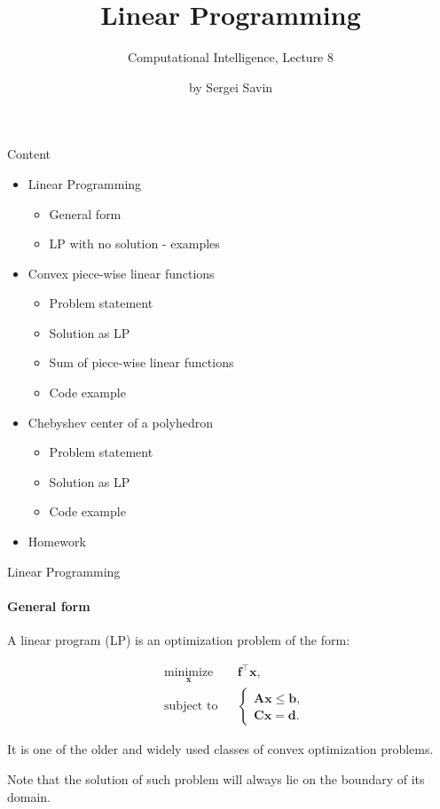 \documentclass{beamer}
\title{Linear Programming}
\subtitle{Computational Intelligence, Lecture 8}
\author{by Sergei Savin}
\date{\mydate}
\begin{document}
\maketitle


\begin{frame}{Content}

\begin{itemize}
\item Linear Programming
\begin{itemize}
    \item General form
    \item LP with no solution - examples
\end{itemize}
\item Convex piece-wise linear functions
\begin{itemize}
    \item Problem statement
    \item Solution as LP
    \item Sum of piece-wise linear functions
    \item Code example
\end{itemize}
\item Chebyshev center of a polyhedron
\begin{itemize}
    \item Problem statement
    \item Solution as LP
    \item Code example
\end{itemize}
\item Homework
\end{itemize}

\end{frame}



\begin{frame}{Linear Programming}
\framesubtitle{General form}
\begin{flushleft}

A linear program (LP) is an optimization problem of the form:

\begin{equation} \label{LP}
\begin{aligned}
& \underset{\mathbf{x}}{\text{minimize}}
& & \mathbf{f}^\top \mathbf{x} , \\
& \text{subject to}
& & \begin{cases} 
\mathbf{A}\mathbf{x} \leq \mathbf{b}, \\
\mathbf{C}\mathbf{x} = \mathbf{d}.
\end{cases}
%
\end{aligned}
\end{equation}

It is one of the older and widely used classes of convex optimization problems. 

\bigskip

Note that the solution of such problem will always lie on the boundary of its domain.
 
\end{flushleft}
\end{frame}
\end{document}
